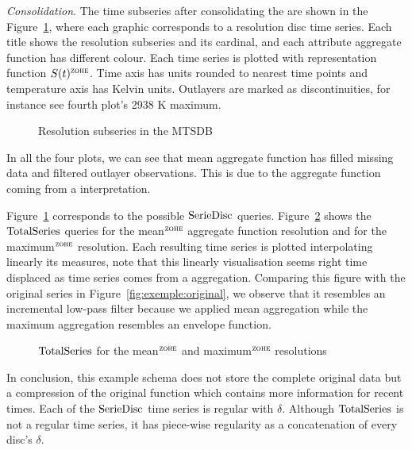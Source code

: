 \emph{Consolidation}. The time subseries after consolidating the
 are shown in the Figure~\ref{fig:exemple:4mrd}, where
each graphic corresponds to a resolution disc time series. Each title
shows the resolution subseries and its cardinal, and each attribute
aggregate function has different colour.  Each time series is plotted
with \zohe{} representation function $S(t)^\zohe{}$. Time axis has  units
rounded to nearest time points and temperature axis has Kelvin
units. Outlayers are marked as discontinuities, for instance see
fourth plot's 2938 K maximum.

\begin{figure}[tp]
  \centering
  
  \caption{Resolution subseries in the MTSDB}
  \label{fig:exemple:4mrd}
\end{figure}

In all the four plots, we can see that mean aggregate function has
filled missing data and filtered outlayer observations. This is due
to the aggregate function coming from a \zohe{} interpretation.


Figure~\ref{fig:exemple:4mrd} corresponds to the possible $\operatorname{SerieDisc}$
queries. Figure~\ref{fig:exemple:4mrdtot} shows the $\operatorname{TotalSeries}$
queries for the mean$^{\zohe}$ aggregate function resolution and for
the maximum$^{\zohe}$ resolution.  Each resulting time series is
plotted interpolating linearly its measures, note that this linearly
visualisation seems right time displaced as time series comes from a
\zohe{} aggregation.  Comparing this figure with the original series
in Figure~\ref{fig:exemple:original}, we observe that it resembles an
incremental low-pass filter because we applied mean aggregation while
the maximum aggregation resembles an envelope function.

\begin{figure}[tp]
  \centering
  
  \caption{$\operatorname{TotalSeries}$ for the mean$^{\zohe}$ and maximum$^{\zohe}$
    resolutions}
  \label{fig:exemple:4mrdtot}
\end{figure}


In conclusion, this  example schema does not store the
complete original data but a compression of the original function
which contains more information for recent times.  Each of the
$\operatorname{SerieDisc}$ time series is regular with $\delta$. Although
$\operatorname{TotalSeries}$ is not a regular time series, it has piece-wise
regularity as a concatenation of every disc's $\delta$.








